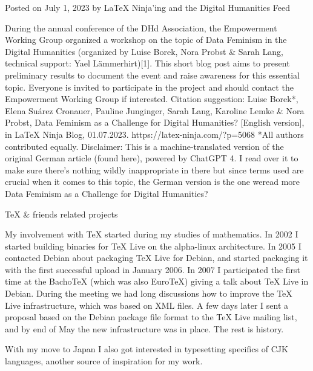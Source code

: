 \documentclass{article}
\begin{document}
Posted on July 1, 2023 by \LaTeX{} Ninja'ing and the Digital Humani\-ties Feed

During the annual conference of the DHd Association, the Empo\-wer\-ment Working Group organized a workshop on the topic of Data Feminism in the Digital Humanities (organized by Luise Borek, Nora Probst \& Sarah Lang, technical support: Yael Lämmerhirt)[1]. This short blog post aims to present preliminary results to document the event and raise awareness for this essential topic. Everyone is invited to participate in the project and should contact the Empowerment Working Group if interested. Citation suggestion: Luise Borek*, Elena Suárez Cronauer, Pauline Junginger, Sarah Lang, Karoline Lemke \& Nora Probst, Data Feminism as a Challenge for Digital Humanities? [English version], in \LaTeX{} Ninja Blog, 01.07.2023. https://latex-ninja.com/?p=5068 *All authors contributed equally. Disclaimer: This is a machine-translated version of the original German article (found here), powered by ChatGPT 4. I read over it to make sure there’s nothing wildly inappropriate in there but since terms used are crucial when it comes to this topic, the German version is the one weread more Data Feminism as a Challenge for Digital Humanities? 

\TeX{} \& friends related projects

My involvement with \TeX{} started during my studies of mathematics. In 2002 I started building binaries for TeX Live on the alpha-linux architecture. In 2005 I contacted Debian about packaging TeX Live for Debian, and started packaging it with the first successful upload in January 2006. In 2007 I participated the first time at the BachoTeX (which was also EuroTeX) giving a talk about TeX Live in Debian. During the meeting we had long discussions how to improve the TeX Live infrastructure, which was based on XML files. A few days later I sent a proposal based on the Debian package file format to the TeX Live mailing list, and by end of May the new infrastructure was in place. The rest is history.

With my move to Japan I also got interested in typesetting specifics of CJK languages, another source of inspiration for my work.
\end{document}
